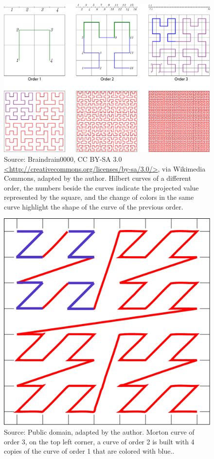 \begin{figure}
    \centering
    \includegraphics[width = \linewidth]{src/imgs/hilbert-curve.pdf}
    \caption{Source: Braindrain0000, CC BY-SA 3.0 \url{<http://creativecommons.org/licenses/by-sa/3.0/>}, via Wikimedia Commons, adapted by the author. Hilbert curves of a different order, the numbers beside the curves indicate the projected value represented by the square, and the change of colors in the same curve highlight the shape of the curve of the previous order.}
    \label{fig:hilbert-curve}
\end{figure}

\begin{figure}
    \centering
    \includegraphics[width = 0.5\linewidth]{src/imgs/morton-curve.pdf}
    \caption{Source: Public domain, adapted by the author. Morton curve of order 3, on the top left corner, a curve of order 2 is built with 4 copies of the curve of order 1 that are colored with blue..}
    \label{fig:morton-curve}
\end{figure}

